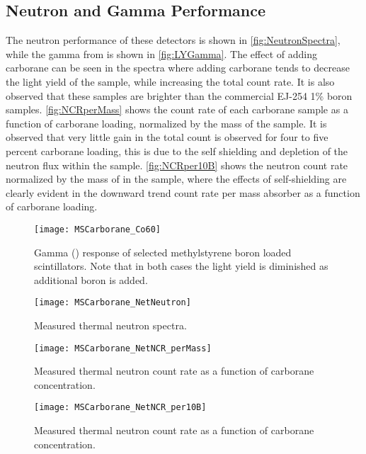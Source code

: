 \documentclass[draftcls,onecolumn]{IEEEtran}
\begin{document}
\subsection{Neutron and Gamma Performance}
The neutron performance of these detectors is shown in \autoref{fig:NeutronSpectra}, while the gamma from  is shown in \autoref{fig:LYGamma}.
The effect of adding carborane can be seen in the spectra where adding carborane tends to decrease the light yield of the sample, while increasing the total count rate.
It is also observed that these samples are brighter than the commercial EJ-254 1\% boron samples.
\autoref{fig:NCRperMass} shows the count rate of each carborane sample as a function of carborane loading, normalized by the mass of the sample. 
It is observed that very little gain in the total count is observed for four to five percent carborane loading, this is due to the self shielding and depletion of the neutron flux within the sample.
\autoref{fig:NCRper10B} shows the neutron count rate normalized by the mass of  in the sample, where the effects of self-shielding are clearly evident in the downward trend count rate per mass absorber as a function of carborane loading.
\begin{figure}
  \centering
  \texttt{[image: MSCarborane\_Co60]}
  \caption[Gamma Response of Carborane Samples]{Gamma () response of selected methylstyrene boron loaded scintillators.  Note that in both cases the light yield is diminished as additional boron is added.}
  \label{fig:LYGamma}
\end{figure}
\begin{figure}
  \centering
  \texttt{[image: MSCarborane\_NetNeutron]}
  \caption[Measured Thermal Neutron Count Rate]{Measured thermal neutron spectra.}
  \label{fig:NeutronSpectra}
\end{figure}
\begin{figure}
  \centering
  \texttt{[image: MSCarborane\_NetNCR\_perMass]}
  \caption[Measured Thermal Neutron Count Rate]{Measured thermal neutron count rate as a function of carborane concentration. }
  \label{fig:NCRperMass}
\end{figure}
\begin{figure}
  \centering
  \texttt{[image: MSCarborane\_NetNCR\_per10B]}
  \caption[Measured Thermal Neutron Count Rate]{Measured thermal neutron count rate as a function of carborane concentration. }
  \label{fig:NCRper10B}
\end{figure}
\end{document}
